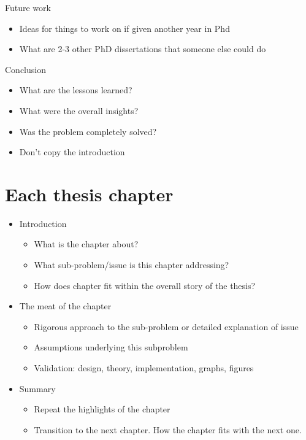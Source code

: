 Future work
\begin{itemize}
    \item Ideas for things to work on if given another year in Phd
    \item What are 2-3 other PhD dissertations that someone else could do
\end{itemize}

Conclusion
\begin{itemize}
    \item What are the lessons learned?
    \item What were the overall insights?
    \item Was the problem completely solved? 
    \item Don't copy the introduction
\end{itemize}

\section{Each thesis chapter}
\begin{itemize}
    \item Introduction
        \begin{itemize}
            \item What is the chapter about?
            \item What sub-problem/issue is this chapter addressing?
            \item How does chapter fit within the overall story of the thesis?
        \end{itemize}
    \item The meat of the chapter
        \begin{itemize}
            \item Rigorous approach to the sub-problem or detailed explanation of issue
            \item Assumptions underlying this subproblem
            \item Validation: design, theory, implementation, graphs, figures
        \end{itemize}

    \item Summary
        \begin{itemize}
            \item Repeat the highlights of the chapter
            \item Transition to the next chapter. 
                How the chapter fits with the next one.
        \end{itemize}
\end{itemize}

